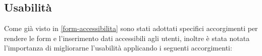 \subsection{Usabilità}
\label{form-usabilita}
Come già visto in \ref{form-accessibilita} sono stati adottati specifici accorgimenti per rendere le form e l'inserimento dati accessibili agli utenti, inoltre è stata notata l'importanza di migliorarne l'usabilità applicando i seguenti accorgimenti: %
